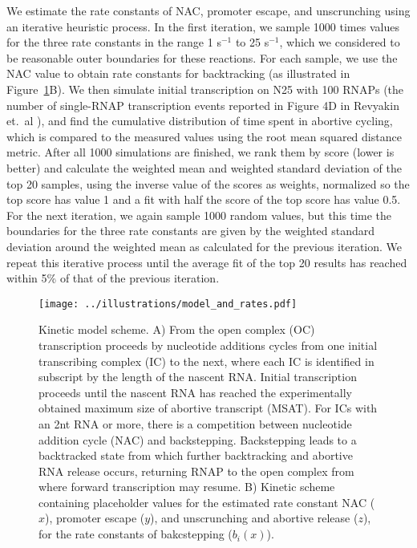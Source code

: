 We estimate the rate constants of NAC, promoter escape, and unscrunching using an
iterative heuristic process. In the first iteration, we sample 1000 times
values for the three rate constants in the range 1 s$^{-1}$ to 25 s$^{-1}$,
which we considered to be reasonable outer boundaries for these reactions. For
each sample, we use the NAC value to obtain rate constants for backtracking
(as illustrated in Figure~\ref{fig:model_and_rates}B). We then simulate
initial transcription on N25 with 100 RNAPs (the number of single-RNAP
transcription events reported in Figure 4D in Revyakin et.\ al
\cite{revyakin_abortive_2006}), and find the cumulative distribution of time
spent in abortive cycling, which is compared to the measured values using the
root mean squared distance metric. After all 1000 simulations are finished, we
rank them by score (lower is better) and calculate the weighted mean and
weighted standard deviation of the top 20 samples, using the inverse value of
the scores as weights, normalized so the top score has value 1 and a fit with
half the score of the top score has value 0.5. For the next iteration, we
again sample 1000 random values, but this time the boundaries for the three
rate constants are given by the weighted standard deviation around the
weighted mean as calculated for the previous iteration. We repeat this
iterative process until the average fit of the top 20 results has reached
within 5\% of that of the previous iteration.

\begin{figure}
	\begin{center}
        \texttt{[image: ../illustrations/model\_and\_rates.pdf]}
	\end{center}
    \caption{Kinetic model scheme. A) From the open complex (OC)
    transcription proceeds by nucleotide additions cycles from one initial
    transcribing complex (IC) to the next, where each IC is identified in
    subscript by the length of the nascent RNA. Initial transcription proceeds
    until the nascent RNA has reached the experimentally obtained maximum size
    of abortive transcript (MSAT). For ICs with an 2nt RNA or
    more, there is a competition between nucleotide addition cycle (NAC)
    and backstepping. Backstepping leads to a backtracked state from which
    further backtracking and abortive RNA release occurs, returning RNAP to
    the open complex from where forward transcription may resume. B) Kinetic
    scheme containing placeholder values for the estimated rate constant NAC
    ($x$), promoter escape ($y$), and unscrunching and abortive release ($z$), for
    the rate constants of bakcstepping ($b_i(x)$).}
    \label{fig:model_and_rates}
\end{figure}



%
